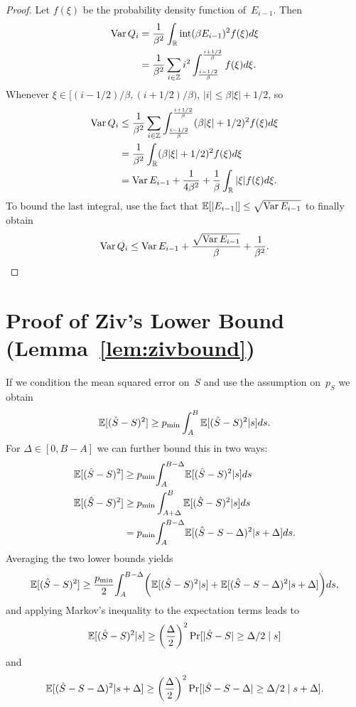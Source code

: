 \begin{subappendices}
\begin{proof}
  Let $f(\xi)$ be the probability density function of~$E_{i-1}$. Then
  \begin{align*}
    \operatorname{Var} Q_i &= \frac{1}{\beta^2} \int_{\mathbb{R}} \operatorname{int}(\beta E_{i-1})^2 f(\xi) d\xi \\
    &= \frac{1}{\beta^2} \sum_{i\in\mathbb{Z}} i^2
    \int_{\frac{i-1/2}{\beta}}^{\frac{i+1/2}{\beta}} f(\xi) d\xi.
  \end{align*}
  Whenever $\xi \in [(i-1/2)/\beta, (i+1/2)/\beta)$, $|i| \le \beta|\xi| + 1/2$,
  so
  \begin{align*}
    \operatorname{Var} Q_i &\le \frac{1}{\beta^2} \sum_{i\in \mathbb{Z}}
    \int_{\frac{i-1/2}{\beta}}^{\frac{i+1/2}{\beta}} (\beta|\xi| + 1/2)^2 
    f(\xi) d\xi \\
    &= \frac{1}{\beta^2} \int_{\mathbb{R}} (\beta|\xi| + 1/2)^2 f(\xi) d\xi \\
    &= \operatorname{Var} E_{i-1} + \frac{1}{4\beta^2} + \frac{1}{\beta} \int_{\mathbb{R}} |\xi|
    f(\xi)d\xi.
  \end{align*}
  To bound the last integral, use the fact that $\mathbb{E}[|E_{i-1}|] \le \sqrt{\operatorname{Var}
  E_{i-1}}$ to finally obtain
  \begin{equation*}
    \operatorname{Var} Q_i \le \operatorname{Var} E_{i-1} + \frac{\sqrt{\operatorname{Var} E_{i-1}}}{\beta} +
    \frac{1}{\beta^2}.
  \end{equation*}
\end{proof}
  

  \section{Proof of Ziv's Lower Bound (Lemma~\ref{lem:zivbound})}
  \label{app:zivboundproof}

  If we condition the mean squared error on~$S$ and use the assumption on~$p_S$
  we obtain
  \begin{equation*}
    {\mathbb{E}[({\hat{S}}- S)^2]} \ge {p_{\min}} \int_A^B {\mathbb{E}[({\hat{S}} - S)^2 | s]} ds.
  \end{equation*}
  For $\Delta \in [0, B-A]$ we can further bound this in two ways:
  \begin{align*}
    {\mathbb{E}[({\hat{S}}- S)^2]} &\ge {p_{\min}} {\int_A^{B-\Delta}} {\mathbb{E}[({\hat{S}}- S)^2 | s]} ds \\
    {\mathbb{E}[({\hat{S}} - S)^2]} &\ge {p_{\min}} \int_{A+\Delta}^B {\mathbb{E}[({\hat{S}} - S)^2 | s]} ds \\
    &= {p_{\min}} {\int_A^{B-\Delta}} {\mathbb{E}[({\hat{S}} - S - \Delta)^2 | s + \Delta]} ds.
  \end{align*}
  Averaging the two lower bounds yields
  \begin{equation}
    \label{eq:avglbd}
    {\mathbb{E}[({\hat{S}}- S)^2]} \ge \frac{{p_{\min}}}{2} {\int_A^{B-\Delta}} \bigg( {\mathbb{E}[({\hat{S}} - S)^2 | s]} + \\
    {\mathbb{E}[({\hat{S}} - S - \Delta)^2 | s + \Delta]} \bigg) ds,
  \end{equation}
  and applying Markov's inequality to the expectation terms leads to
  \begin{equation}
    \label{eq:markov1}
    {\mathbb{E}[({\hat{S}}- S)^2 | s]} \ge {\left(\frac{\Delta}{2}\right)^2} \Pr[|{\hat{S}} - S| \ge \Delta/2 \mid s]
  \end{equation}
  and
  \begin{equation}
    \label{eq:markov2}
    {\mathbb{E}[({\hat{S}}- S - \Delta)^2 | s + \Delta]} \\
    \ge {\left(\frac{\Delta}{2}\right)^2} \Pr[|{\hat{S}} - S - \Delta| \ge \Delta/2 \mid s+\Delta].
  \end{equation}


\end{subappendices}
